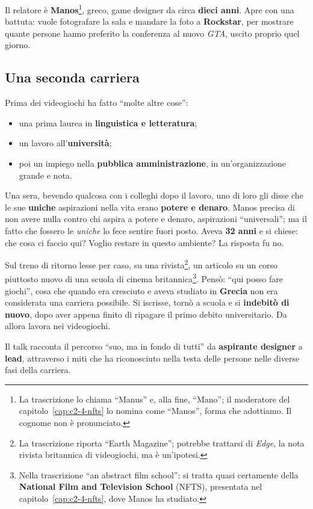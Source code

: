Il relatore è \textbf{Manos}\footnote{La trascrizione lo chiama ``Manus'' e, alla
fine, ``Mano''; il moderatore del capitolo~\ref{cap:c2-4-nfts} lo nomina come
``Manos'', forma che adottiamo. Il cognome non è pronunciato.}, greco, game
designer da circa \textbf{dieci anni}. Apre con una battuta: vuole fotografare la
sala e mandare la foto a \textbf{Rockstar}, per mostrare quante persone hanno
preferito la conferenza al nuovo \emph{GTA}, uscito proprio quel giorno.

\subsection{Una seconda carriera}

Prima dei videogiochi ha fatto ``molte altre cose'':
\begin{itemize}
  \item una prima laurea in \textbf{linguistica e letteratura};
  \item un lavoro all'\textbf{università};
  \item poi un impiego nella \textbf{pubblica amministrazione}, in
        un'organizzazione grande e nota.
\end{itemize}
Una sera, bevendo qualcosa con i colleghi dopo il lavoro, uno di loro gli disse che
le sue \textbf{uniche} aspirazioni nella vita erano \textbf{potere e denaro}. Manos
precisa di non avere nulla contro chi aspira a potere e denaro, aspirazioni
``universali''; ma il fatto che fossero le \emph{uniche} lo fece sentire fuori
posto. Aveva \textbf{32 anni} e si chiese: che cosa ci faccio qui? Voglio restare in
questo ambiente? La risposta fu no.

Sul treno di ritorno lesse per caso, su una rivista\footnote{La trascrizione
riporta ``Earth Magazine''; potrebbe trattarsi di \emph{Edge}, la nota rivista
britannica di videogiochi, ma è un'ipotesi.}, un articolo su un corso piuttosto
nuovo di una scuola di cinema britannica\footnote{Nella trascrizione ``an
abstract film school'': si tratta quasi certamente della \textbf{National Film and
Television School} (NFTS), presentata nel capitolo~\ref{cap:c2-4-nfts}, dove
Manos ha studiato.}. Pensò: ``qui posso fare giochi'', cosa che quando era cresciuto
e aveva studiato in \textbf{Grecia} non era considerata una carriera possibile. Si
iscrisse, tornò a scuola e si \textbf{indebitò di nuovo}, dopo aver appena finito
di ripagare il primo debito universitario. Da allora lavora nei videogiochi.

Il talk racconta il percorso ``suo, ma in fondo di tutti'' da \textbf{aspirante
designer} a \textbf{lead}, attraverso i miti che ha riconosciuto nella testa delle
persone nelle diverse fasi della carriera.

